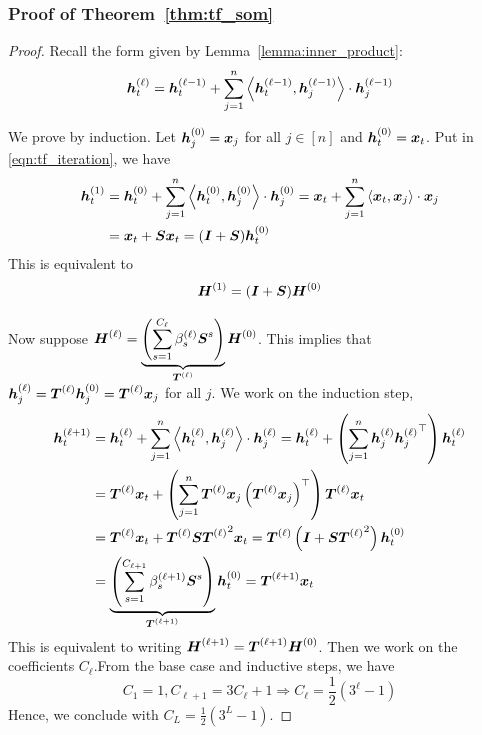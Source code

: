 \subsubsection{Proof of Theorem~\ref{thm:tf_som}}
\begin{proof}
Recall the form given by Lemma~\ref{lemma:inner_product}:
    \begin{equation}
        \boldsymbol{h}_t^{(\ell)} = \boldsymbol{h}_t^{(\ell-1)} + \sum_{j=1}^n \left\langle {\boldsymbol{h}_t^{(\ell-1)}, \boldsymbol{h}_j^{(\ell-1)}} \right\rangle \cdot \boldsymbol{h}_j^{(\ell-1)}
    \label{eqn:tf_iteration}
    \end{equation}
    
We prove by induction. 
Let $\boldsymbol{h}_j^{(0)} = \boldsymbol{x}_j$ for all $j \in [n]$ and $\boldsymbol{h}_t^{(0)} = \boldsymbol{x}_t$. Put in \cref{eqn:tf_iteration}, we have
\begin{equation}
\begin{aligned}
    \boldsymbol{h}_t^{(1)} &= \boldsymbol{h}_t^{(0)} + \sum_{j=1}^n \left\langle {\boldsymbol{h}_t^{(0)}, \boldsymbol{h}_j^{(0)}} \right\rangle \cdot \boldsymbol{h}_j^{(0)} = \boldsymbol{x}_t +  \sum_{j=1}^n \left\langle {\boldsymbol{x}_t, \boldsymbol{x}_j} \right\rangle \cdot \boldsymbol{x}_j \\
    &= \boldsymbol{x}_t + \boldsymbol{S} \boldsymbol{x}_t = (\boldsymbol{I} + \boldsymbol{S}) \boldsymbol{h}_t^{(0)}
\end{aligned}
\end{equation}
This is equivalent to 
\begin{equation}
    \boldsymbol{H}^{(1)} = (\boldsymbol{I} + \boldsymbol{S}) \boldsymbol{H}^{(0)}
\end{equation}

Now suppose $\displaystyle \boldsymbol{H}^{(\ell)} = \underbrace{\left(\sum_{s=1}^{C_\ell} \beta_s^{(\ell)} \boldsymbol{S}^s\right)}_{\boldsymbol{T}^{(\ell)}}\boldsymbol{H}^{(0)}$. This implies that 
$\boldsymbol{h}_j^{(\ell)} = \boldsymbol{T}^{(\ell)} \boldsymbol{h}_j^{(0)} = \boldsymbol{T}^{(\ell)} \boldsymbol{x}_j$ for all $j$. We work on the induction step,
\begin{equation}
\begin{aligned}
    \boldsymbol{h}_t^{(\ell+1)} &= \boldsymbol{h}_t^{(\ell)} + \sum_{j=1}^n \left\langle {\boldsymbol{h}_t^{(\ell)}, \boldsymbol{h}_j^{(\ell)}} \right\rangle \cdot \boldsymbol{h}_j^{(\ell)}  = \boldsymbol{h}_t^{(\ell)} + \left(\sum_{j=1}^n  \boldsymbol{h}_j^{(\ell)}  {\boldsymbol{h}_j^{(\ell)}}^\top\right)  \boldsymbol{h}_t^{(\ell)}  \\
    &= \boldsymbol{T}^{(\ell)} \boldsymbol{x}_t + \left(\sum_{j=1}^n  \boldsymbol{T}^{(\ell)} \boldsymbol{x}_j  \left(\boldsymbol{T}^{(\ell)} \boldsymbol{x}_j\right)^\top\right)  \boldsymbol{T}^{(\ell)} \boldsymbol{x}_t \\
    &= \boldsymbol{T}^{(\ell)} \boldsymbol{x}_t + \boldsymbol{T}^{(\ell)} \boldsymbol{S} {\boldsymbol{T}^{(\ell)}}^2 \boldsymbol{x}_t = \boldsymbol{T}^{(\ell)} \left(\boldsymbol{I} + \boldsymbol{S} {\boldsymbol{T}^{(\ell)}}^2 \right) \boldsymbol{h}_t^{(0)} \\
    &= \underbrace{\left(\sum_{s=1}^{C_{\ell+1}} \beta_s^{(\ell+1)} \boldsymbol{S}^s\right)}_{\boldsymbol{T}^{(\ell+1)}} \boldsymbol{h}_t^{(0)} = \boldsymbol{T}^{(\ell+1)} \boldsymbol{x}_t
\end{aligned}
\end{equation}
This is equivalent to writing
$ \boldsymbol{H}^{(\ell+1)} = \boldsymbol{T}^{(\ell+1)} \boldsymbol{H}^{(0)}$. Then we work on the coefficients $C_\ell$.From the base case and inductive steps, we have
\begin{equation}
        C_1 = 1, C_{\ell+1} = 3 C_{\ell} + 1
    \Longrightarrow C_\ell =\frac{1}{2} \left(3^{\ell} - 1\right) 
\end{equation}
Hence, we conclude with $C_L = \frac{1}{2} \left(3^{L} - 1\right)$. 


\end{proof}
